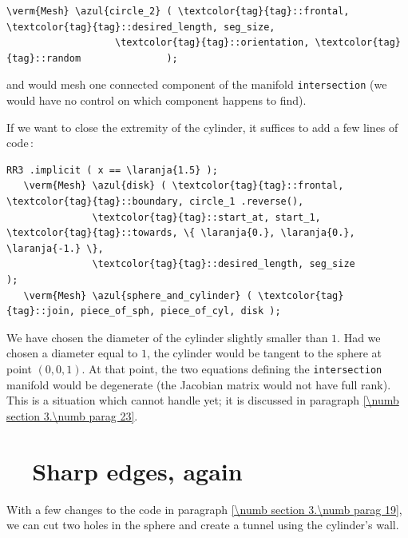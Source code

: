 \begin{Verbatim}[commandchars=\\\{\},formatcom=\small\tt,
   baselinestretch=0.94,framesep=2mm                     ]
   \verm{Mesh} \azul{circle_2} ( \textcolor{tag}{tag}::frontal, \textcolor{tag}{tag}::desired_length, seg_size,
                   \textcolor{tag}{tag}::orientation, \textcolor{tag}{tag}::random               );
\end{Verbatim}

\noindent and {\maniFEM} would mesh one connected component of the manifold {\small\tt intersection}
(we would have no control on which component {\maniFEM} happens to find).

If we want to close the extremity of the cylinder, it suffices to add a few lines of code$\,$:

\begin{Verbatim}[commandchars=\\\{\},formatcom=\small\tt,
   baselinestretch=0.94,framesep=2mm                     ]
   RR3 .implicit ( x == \laranja{1.5} );
   \verm{Mesh} \azul{disk} ( \textcolor{tag}{tag}::frontal, \textcolor{tag}{tag}::boundary, circle_1 .reverse(),
               \textcolor{tag}{tag}::start_at, start_1, \textcolor{tag}{tag}::towards, \{ \laranja{0.}, \laranja{0.}, \laranja{-1.} \},
               \textcolor{tag}{tag}::desired_length, seg_size                         );
   \verm{Mesh} \azul{sphere_and_cylinder} ( \textcolor{tag}{tag}::join, piece_of_sph, piece_of_cyl, disk );
\end{Verbatim}

We have chosen the diameter of the cylinder slightly smaller than $1$.
Had we chosen a diameter equal to $1$, the cylinder would be tangent to the sphere at point
$ (0,0,1) $.
At that point, the two equations defining the {\small\tt intersection} manifold would be
degenerate (the Jacobian matrix would not have full rank).
This is a situation which {\maniFEM} cannot handle yet; it is discussed in paragraph
\ref{\numb section 3.\numb parag 23}.


\section{~~Sharp edges, again}\label{\numb section 3.\numb parag 20}

With a few changes to the code in paragraph \ref{\numb section 3.\numb parag 19},
we can cut two holes in the sphere and create a tunnel using the cylinder's wall.
\medskip

